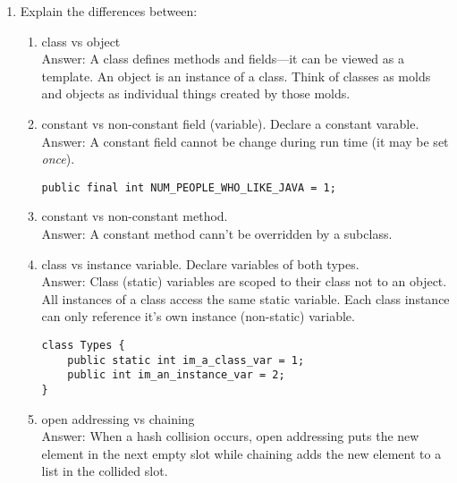 \documentclass[11pt]{article}
\newenvironment{answer}{\large\lstset{basicstyle=\large\ttfamily}\color{white} \small{Answer:}\large}{}
\newenvironment{answer}{\large\lstset{basicstyle=\large\ttfamily}\color{red} \small{Answer:}\large}{}
\begin{document}
\begin{enumerate}
\item Explain the differences between:
\begin{enumerate}
	\item class vs object \\
	\begin{answer}
	A class defines methods and fields---it can be viewed as a template. An object is an instance of a class. Think of classes as molds and objects as individual things created by those molds.
	\end{answer}	
	
	\item constant vs non-constant field (variable).  Declare a constant varable. \\
	\begin{answer}
	A constant field cannot be change during run time (it may be set {\em once}).
		\begin{lstlisting}[numbers=none]
public final int NUM_PEOPLE_WHO_LIKE_JAVA = 1;
		\end{lstlisting}
	\end{answer}
	
	\item constant vs non-constant method.  \\
	\begin{answer}
	A constant method cann't be overridden by a subclass.
	\end{answer}

	\item class vs instance variable.  Declare variables of both types.\\
	\begin{answer}
	Class (static) variables are scoped to their class not to an object.  All instances of a class access the same static variable.  Each class instance can only reference it's own instance (non-static) variable.
		\begin{lstlisting}[numbers=none]
class Types {
	public static int im_a_class_var = 1;
	public int im_an_instance_var = 2;
}
		\end{lstlisting}
	\end{answer}
	
	\item open addressing vs chaining \\
	\begin{answer}
	When a hash collision occurs, open addressing puts the new element in the next empty slot while chaining adds the new element to a list in the collided slot.  
	\end{answer}
\end{enumerate}




\end{enumerate}
\end{document}
